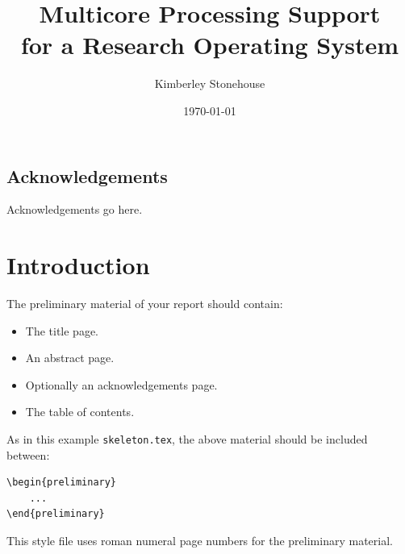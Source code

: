 \documentclass[bsc,frontabs,singlespacing,parskip,deptreport]{infthesis}
\begin{document}
\begin{preliminary}

\title{Multicore Processing Support \\ for a Research Operating System}

\author{Kimberley Stonehouse}



\date{\today}


\maketitle

\section*{Acknowledgements}
Acknowledgements go here. 

\tableofcontents
\end{preliminary}

\chapter{Introduction}

The preliminary material of your report should contain:
\begin{itemize}
\item
The title page.
\item
An abstract page.
\item
Optionally an acknowledgements page.
\item
The table of contents.
\end{itemize}

As in this example \texttt{skeleton.tex}, the above material should be
included between:
\begin{verbatim}
\begin{preliminary}
    ...
\end{preliminary}
\end{verbatim}
This style file uses roman numeral page numbers for the preliminary material.
\end{document}
